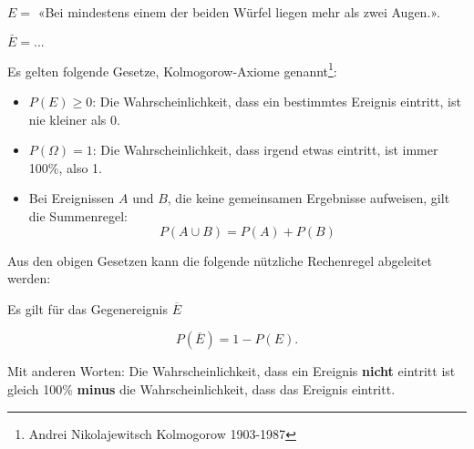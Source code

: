 $E=$ «Bei mindestens einem der beiden Würfel liegen
mehr als zwei Augen.».

$\bar{E} = ...$


\newpage




Es gelten folgende Gesetze, Kolmogorow-Axiome genannt\footnote{Andrei Nikolajewitsch
  Kolmogorow 1903-1987}:

\begin{gesetz}{}{}
\begin{itemize}

\item $P(E) \ge 0$: Die Wahrscheinlichkeit, dass ein bestimmtes Ereignis eintritt, ist nie kleiner als 0.

\item $P(\Omega) = 1$: Die Wahrscheinlichkeit, dass irgend etwas eintritt, ist immer 100\%, also 1.

\item Bei Ereignissen $A$ und $B$, die keine gemeinsamen Ergebnisse aufweisen, gilt die Summenregel:   $$P(A\cup B) = P(A) + P(B)$$

\end{itemize}
\end{gesetz}

Aus den obigen Gesetzen kann die folgende nützliche Rechenregel abgeleitet werden:

\begin{gesetz}{}{}
  Es gilt für das Gegenereignis $\overline{E}$

  $$P(\overline{E}) = 1-P(E).$$

  Mit anderen Worten: Die
  Wahrscheinlichkeit, dass ein Ereignis \textbf{nicht} eintritt ist
  gleich 100\% \textbf{minus} die Wahrscheinlichkeit, dass das
  Ereignis eintritt.
\end{gesetz}

